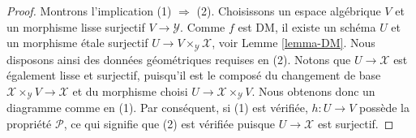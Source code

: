 \begin{proof}
Montrons l'implication (1) $\Rightarrow$ (2). Choisissons un espace
algébrique $V$ et un morphisme lisse surjectif $V \to \mathcal{Y}$.
Comme $f$ est DM, il existe un schéma $U$ et un morphisme \'etale surjectif
$U \to V \times_\mathcal{Y} \mathcal{X}$, voir
Lemme \ref{lemma-DM}. Nous disposons ainsi des données géométriques requises en (2).
Notons que $U \to \mathcal{X}$ est également lisse et surjectif, puisqu'il est le
composé du changement de base
$\mathcal{X} \times_\mathcal{Y} V \to \mathcal{X}$ et du morphisme choisi
$U \to \mathcal{X} \times_\mathcal{Y} V$. Nous obtenons donc un
diagramme comme en (1). Par conséquent, si (1) est vérifiée, $h : U \to V$ possède la propriété
$\mathcal{P}$, ce qui signifie que (2) est vérifiée puisque $U \to \mathcal{X}$ est surjectif.


\end{proof}

